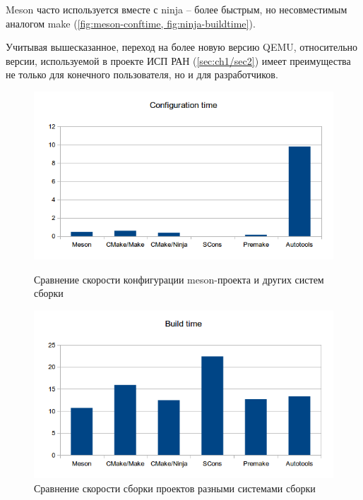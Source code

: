 Meson часто используется вместе с ninja \cite{ninja} -- более быстрым,
но несовместимым аналогом make (\cref{fig:meson-conftime, fig:ninja-buildtime}).

Учитывая вышесказанное, переход на более новую версию QEMU, относительно
версии, используемой в проекте ИСП РАН (\cref{sec:ch1/sec2})
имеет преимущества не только для конечного пользователя, но и для разработчиков.

\begin{figure}[!htbp]
    \centering
    \begin{adjustbox}{max totalsize={\textwidth}{\textheight}}
        \includegraphics[]{images/conftime.png}
    \end{adjustbox}
    \caption{Сравнение скорости конфигурации meson-проекта и других систем сборки}\label{fig:meson-conftime}

    \begin{adjustbox}{max totalsize={\textwidth}{\textheight}}
        \includegraphics[]{images/buildtime.png}
    \end{adjustbox}
    \caption{Сравнение скорости сборки проектов разными системами сборки}\label{fig:ninja-buildtime}
\end{figure}


